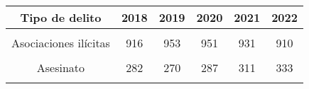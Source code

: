 \begin{tabular}[t]{cccccc}
\toprule
\textbf{Tipo de delito} & \textbf{2018} & \textbf{2019} & \textbf{2020} & \textbf{2021} & \textbf{2022}\\
\midrule
\cellcolor[HTML]{B6B3FF}{Extorsión} & \cellcolor[HTML]{B6B3FF}{1,219} & \cellcolor[HTML]{B6B3FF}{1,418} & \cellcolor[HTML]{B6B3FF}{1,513} & \cellcolor[HTML]{B6B3FF}{1,667} & \cellcolor[HTML]{B6B3FF}{2,278}\\
Asociaciones ilícitas & 916 & 953 & 951 & 931 & 910\\
\cellcolor[HTML]{B6B3FF}{Obstrucción extorsiva de transito} & \cellcolor[HTML]{B6B3FF}{424} & \cellcolor[HTML]{B6B3FF}{449} & \cellcolor[HTML]{B6B3FF}{451} & \cellcolor[HTML]{B6B3FF}{414} & \cellcolor[HTML]{B6B3FF}{414}\\
Asesinato & 282 & 270 & 287 & 311 & 333\\
\cellcolor[HTML]{B6B3FF}{Lavado de dinero u otros activos} & \cellcolor[HTML]{B6B3FF}{160} & \cellcolor[HTML]{B6B3FF}{179} & \cellcolor[HTML]{B6B3FF}{174} & \cellcolor[HTML]{B6B3FF}{178} & \cellcolor[HTML]{B6B3FF}{185}\\
\bottomrule
\end{tabular}
